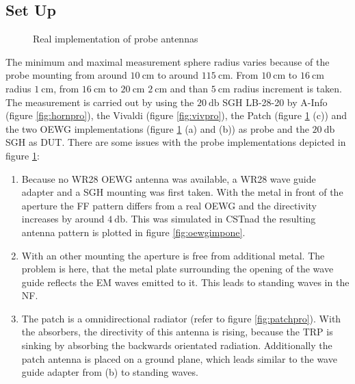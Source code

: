 \subsection{Set Up}

\begin{figure}[H]
  \centering
  \centering
  \centering
\caption{Real implementation of probe antennas}
\label{fig:realprobe}
\end{figure}

The minimum and maximal measurement sphere radius varies because of the probe mounting from around $\SI{10}{\centi\meter}$ to around $\SI{115}{\centi\meter}$. From $\SI{10}{\centi\meter}$ to $\SI{16}{\centi\meter}$ radius $\SI{1}{\centi\meter}$, from $\SI{16}{\centi\meter}$ to $\SI{20}{\centi\meter}$ $\SI{2}{\centi\meter}$ and than $\SI{5}{\centi\meter}$ radius increment is taken. The measurement is carried out by using the $\SI{20}{\decibel}$ \ac{SGH} LB-28-20 by A-Info (figure \ref{fig:hornpro}), the Vivaldi (figure \ref{fig:vivpro}), the Patch (figure \ref{fig:realprobe} (c)) and the two \ac{OEWG} implementations (figure \ref{fig:realprobe} (a) and (b)) as probe and the $\SI{20}{\decibel}$ \ac{SGH} as \ac{DUT}. There are some issues with the probe implementations depicted in figure \ref{fig:realprobe}:

\begin{enumerate}[label=(\alph*)]
\item Because no WR28 \ac{OEWG} antenna was available, a WR28 wave guide adapter and a \ac{SGH} mounting was first taken. With the metal in front of the aperture the \ac{FF} pattern differs from a real \ac{OEWG} and the directivity increases by around $\SI{4}{\decibel}$. This was simulated in CST\texttrademark nad the resulting antenna pattern is plotted in figure \ref{fig:oewgimpone}.
\item With an other mounting the aperture is free from additional metal. The problem is here, that the metal plate surrounding the opening of the wave guide reflects the \ac{EM} waves emitted to it. This leads to standing waves in the \ac{NF}.
\item The patch is a omnidirectional radiator (refer to figure \ref{fig:patchpro}). With the absorbers, the directivity of this antenna is rising, because the \ac{TRP} is sinking by absorbing the backwards orientated radiation. Additionally the patch antenna is placed on a ground plane, which leads similar to the wave guide adapter from (b) to standing waves.
\end{enumerate}

